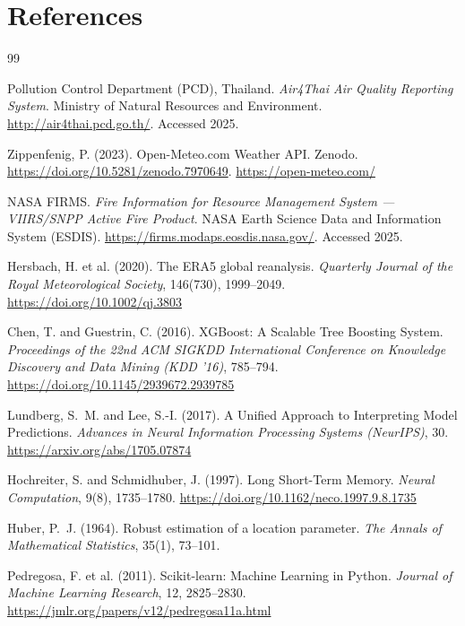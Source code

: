 \chapter*{References}

\begin{thebibliography}{99}


Pollution Control Department (PCD), Thailand. \textit{Air4Thai Air Quality
Reporting System}. Ministry of Natural Resources and Environment.
\url{http://air4thai.pcd.go.th/}. Accessed 2025.

Zippenfenig, P. (2023). Open-Meteo.com Weather API.
Zenodo. \url{https://doi.org/10.5281/zenodo.7970649}.
\url{https://open-meteo.com/}

NASA FIRMS. \textit{Fire Information for Resource Management System —
VIIRS/SNPP Active Fire Product}. NASA Earth Science Data and Information
System (ESDIS). \url{https://firms.modaps.eosdis.nasa.gov/}. Accessed 2025.

Hersbach, H. et al. (2020). The ERA5 global reanalysis.
\textit{Quarterly Journal of the Royal Meteorological Society},
146(730), 1999--2049. \url{https://doi.org/10.1002/qj.3803}


Chen, T. and Guestrin, C. (2016). XGBoost: A Scalable Tree Boosting System.
\textit{Proceedings of the 22nd ACM SIGKDD International Conference on
Knowledge Discovery and Data Mining (KDD '16)}, 785--794.
\url{https://doi.org/10.1145/2939672.2939785}

Lundberg, S.~M. and Lee, S.-I. (2017). A Unified Approach to Interpreting
Model Predictions. \textit{Advances in Neural Information Processing Systems
(NeurIPS)}, 30. \url{https://arxiv.org/abs/1705.07874}

Hochreiter, S. and Schmidhuber, J. (1997). Long Short-Term Memory.
\textit{Neural Computation}, 9(8), 1735--1780.
\url{https://doi.org/10.1162/neco.1997.9.8.1735}

Huber, P.~J. (1964). Robust estimation of a location parameter.
\textit{The Annals of Mathematical Statistics}, 35(1), 73--101.

Pedregosa, F. et al. (2011). Scikit-learn: Machine Learning in Python.
\textit{Journal of Machine Learning Research}, 12, 2825--2830.
\url{https://jmlr.org/papers/v12/pedregosa11a.html}


\end{thebibliography}
